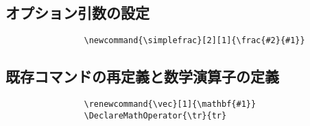         \subsection{オプション引数の設定}
            \begin{verbatim}
                \newcommand{\simplefrac}[2][1]{\frac{#2}{#1}}
            \end{verbatim}

        \subsection{既存コマンドの再定義と数学演算子の定義}
            \begin{verbatim}
                \renewcommand{\vec}[1]{\mathbf{#1}}
                \DeclareMathOperator{\tr}{tr}
            \end{verbatim}

